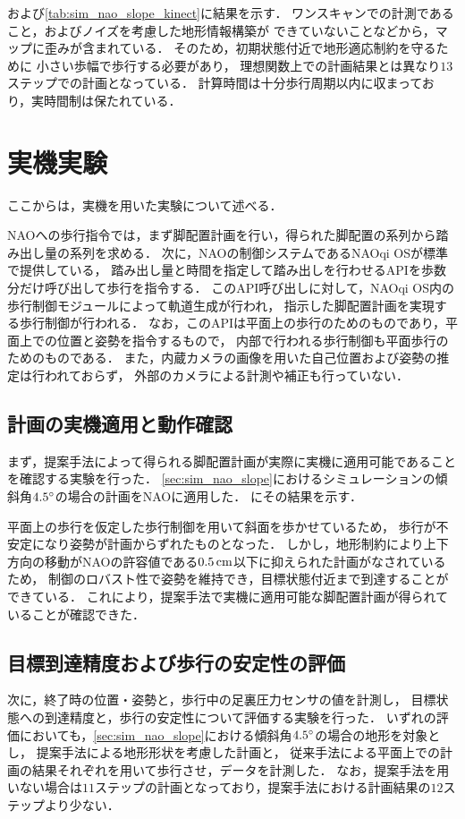 \documentclass[autodetect-engine,dvipdfmx-if-dvi,ja=standard,a4j,jbase=11pt,magstyle=nomag*]{bxjsreport}
\begin{document}
および\cref{tab:sim_nao_slope_kinect}に結果を示す．
ワンスキャンでの計測であること，およびノイズを考慮した地形情報構築が
できていないことなどから，マップに歪みが含まれている．
そのため，初期状態付近で地形適応制約を守るために
小さい歩幅で歩行する必要があり，
理想関数上での計画結果とは異なり$13$ステップでの計画となっている．
計算時間は十分歩行周期以内に収まっており，実時間制は保たれている．


\section{実機実験}
ここからは，実機を用いた実験について述べる．

NAOへの歩行指令では，まず脚配置計画を行い，得られた脚配置の系列から踏み出し量の系列を求める．
次に，NAOの制御システムであるNAOqi OSが標準で提供している，
踏み出し量と時間を指定して踏み出しを行わせるAPIを歩数分だけ呼び出して歩行を指令する．
このAPI呼び出しに対して，NAOqi OS内の歩行制御モジュールによって軌道生成が行われ，
指示した脚配置計画を実現する歩行制御が行われる．
なお，このAPIは平面上の歩行のためのものであり，平面上での位置と姿勢を指令するもので，
内部で行われる歩行制御も平面歩行のためのものである．
また，内蔵カメラの画像を用いた自己位置および姿勢の推定は行われておらず，
外部のカメラによる計測や補正も行っていない．


\subsection{計画の実機適用と動作確認}
まず，提案手法によって得られる脚配置計画が実際に実機に適用可能であることを確認する実験を行った．
\cref{sec:sim_nao_slope}におけるシミュレーションの傾斜角$4.5\degree$の場合の計画をNAOに適用した．
にその結果を示す．


平面上の歩行を仮定した歩行制御を用いて斜面を歩かせているため，
歩行が不安定になり姿勢が計画からずれたものとなった．
しかし，地形制約により上下方向の移動がNAOの許容値である$0.5\,\si{\centi\meter}$以下に抑えられた計画がなされているため，
制御のロバスト性で姿勢を維持でき，目標状態付近まで到達することができている．
これにより，提案手法で実機に適用可能な脚配置計画が得られていることが確認できた．


\subsection{目標到達精度および歩行の安定性の評価}
次に，終了時の位置・姿勢と，歩行中の足裏圧力センサの値を計測し，
目標状態への到達精度と，歩行の安定性について評価する実験を行った．
いずれの評価においても，\cref{sec:sim_nao_slope}における傾斜角$4.5\degree$の場合の地形を対象とし，
提案手法による地形形状を考慮した計画と，
従来手法による平面上での計画の結果それぞれを用いて歩行させ，データを計測した．
なお，提案手法を用いない場合は$11$ステップの計画となっており，提案手法における計画結果の$12$ステップより少ない．
\end{document}

